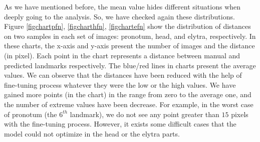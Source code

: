 \documentclass[review]{elsarticle}
\begin{document}
As we have mentioned before, the mean value hides different situations
when deeply going to the analysis. So, we have checked again these
distributions. Figure \ref{figchartpfn}, \ref{figcharthfn},
\ref{figchartefn} show the distribution of distances on two samples in
each set of images: pronotum, head, and elytra, respectively. In these
charts, the x-axis and y-axis present the number of images and the
distance (in pixel). Each point in the chart represents a distance
between manual and predicted landmarks respectively. The blue/red lines in charts
present the average values. We can observe that the distances have been reduced with
the help of fine-tuning process whatever they were the low or the high values. We have gained more points (in
the chart) in the range from zero to the average one, and the number
of extreme values have been decrease. For example, in the
worst case of pronotum (the $6^{th}$ landmark), we do not see any
point greater than $15$ pixels with the fine-tuning process. However,
it exists some difficult cases that the model could not optimize in
the head or the elytra parts.
\end{document}

